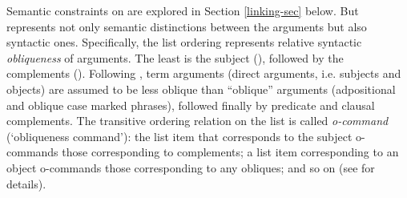 \documentclass[output=paper
                ,modfonts
                ,nonflat
	        ,collection
	        ,collectionchapter
	        ,collectiontoclongg
 	        ,biblatex
                ,babelshorthands
                ,newtxmath
                ,draftmode
                ,colorlinks, citecolor=brown
]{./langsci/langscibook}
\begin{document}
Semantic constraints on \argst are explored in Section \ref{linking-sec} below.  But \argst represents not only
semantic distinctions between the arguments but also  %
syntactic  ones.  Specifically, the list ordering represents relative syntactic \textit{obliqueness} of arguments.   The least  is the subject (\subj), followed by the complements (\comps).  Following \citet{Manning1996}, term arguments (direct arguments, i.e. subjects and objects) are  assumed to be less oblique than ``oblique'' arguments (adpositional and oblique case marked phrases), followed finally by predicate and clausal complements.  The transitive ordering relation on the \argst list is called \textit{o-command} (`obliqueness command'):  the list item that corresponds to the subject o-commands those corresponding to complements; a list item corresponding to an object o-commands  those corresponding to any obliques; and so on (see  for details).
 


\end{document}
